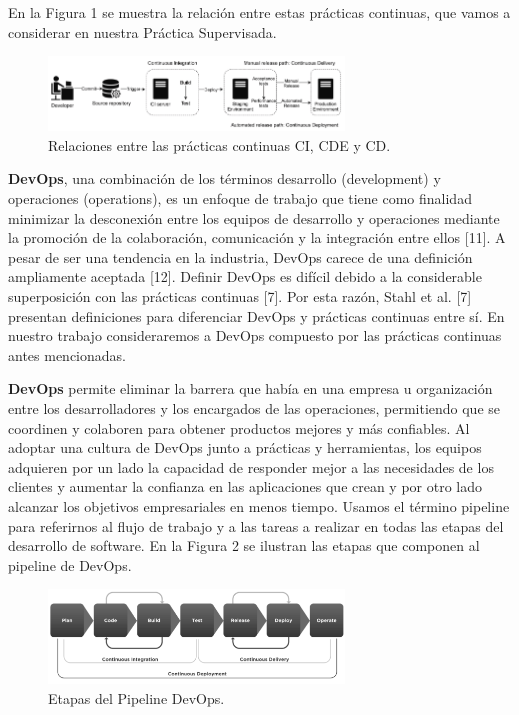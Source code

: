 En la Figura 1 se muestra la relación entre estas prácticas continuas, que vamos a considerar en nuestra Práctica Supervisada.

\begin{figure}[htp]
    \centering
    \includegraphics[width=0.7\textwidth]{fig/pipeline1.png}
    \caption{Relaciones entre las prácticas continuas CI, CDE y CD.}
    \label{fig:pipeline1}
\end{figure}
\textbf{DevOps}, una combinación de los términos desarrollo (development) y operaciones (operations), es un enfoque de trabajo que tiene como finalidad  minimizar la desconexión entre los equipos de desarrollo y operaciones mediante la promoción de la colaboración, comunicación y la integración entre ellos [11]. A pesar de ser una tendencia en la industria, DevOps carece de una definición ampliamente aceptada [12]. Definir DevOps es difícil debido a la considerable superposición con las prácticas continuas [7]. Por esta razón, Stahl et al. [7] presentan definiciones para diferenciar DevOps y prácticas continuas entre sí. En nuestro trabajo consideraremos a DevOps compuesto por las prácticas continuas antes mencionadas.

\textbf{DevOps} permite eliminar la barrera que había en una empresa u organización entre los desarrolladores  y  los encargados de las operaciones, permitiendo que se coordinen y colaboren para obtener productos mejores y más confiables. Al adoptar una cultura de DevOps junto a prácticas y herramientas, los equipos adquieren por un lado la  capacidad de responder mejor a las necesidades de los clientes y aumentar la confianza en las aplicaciones que crean y por otro lado alcanzar los objetivos empresariales en menos tiempo. Usamos el término pipeline para referirnos al flujo de trabajo y a las tareas a realizar en todas las etapas del desarrollo de software. En la Figura 2 se ilustran las etapas que componen al pipeline de DevOps.

\begin{figure}[htp]
    \centering
    \includegraphics[width=0.7\textwidth]{fig/pipeline2.png}
    \caption{Etapas del Pipeline DevOps.}
    \label{fig:pipeline2}
\end{figure}

